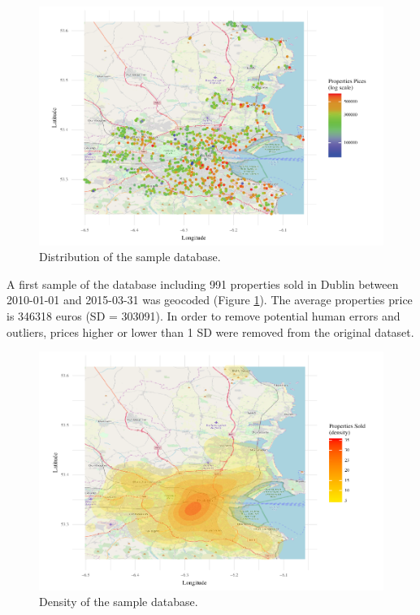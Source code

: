\documentclass[]{elsarticle} %
\begin{document}
\begin{figure}[H]

\includegraphics{property_price_paper_files/figure-latex/distrib-plot-1} \hfill{}

\caption{Distribution of the sample database.}\label{fig:distrib-plot}
\end{figure}

A first sample of the database including 991 properties sold in Dublin
between 2010-01-01 and 2015-03-31 was geocoded (Figure
\ref{fig:distrib-plot}). The average properties price is 346318 euros
(SD = 303091). In order to remove potential human errors and outliers,
prices higher or lower than 1 SD were removed from the original dataset.

\begin{figure}[H]

\includegraphics{property_price_paper_files/figure-latex/density-plot-1} \hfill{}

\caption{Density of the sample database.}\label{fig:density-plot}
\end{figure}
\end{document}
